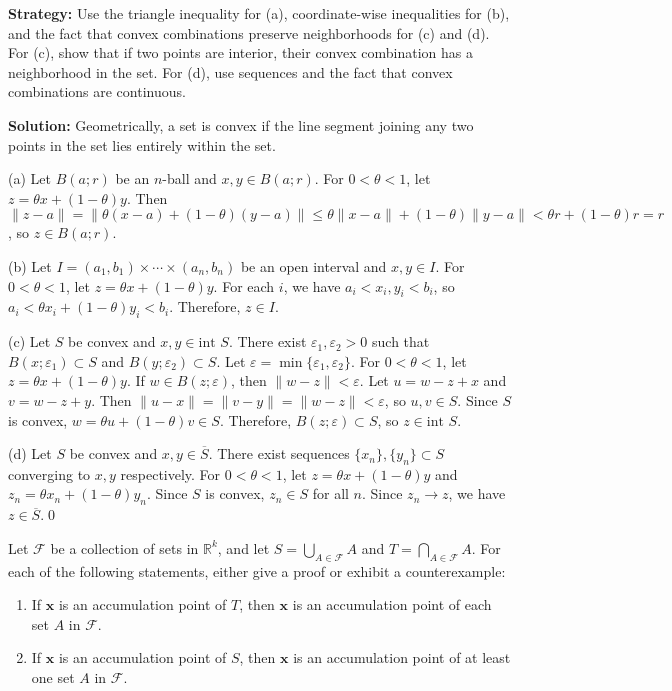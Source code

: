 \noindent\textbf{Strategy:} Use the triangle inequality for (a), coordinate-wise inequalities for (b), and the fact that convex combinations preserve neighborhoods for (c) and (d). For (c), show that if two points are interior, their convex combination has a neighborhood in the set. For (d), use sequences and the fact that convex combinations are continuous.

\bigskip\noindent\textbf{Solution:} Geometrically, a set is convex if the line segment joining any two points in the set lies entirely within the set.

(a) Let $B(a;r)$ be an $n$-ball and $x, y \in B(a;r)$. For $0 < \theta < 1$, let $z = \theta x + (1-\theta)y$. Then $\|z-a\| = \|\theta(x-a) + (1-\theta)(y-a)\| \leq \theta\|x-a\| + (1-\theta)\|y-a\| < \theta r + (1-\theta)r = r$, so $z \in B(a;r)$.

(b) Let $I = (a_1,b_1) \times \cdots \times (a_n,b_n)$ be an open interval and $x, y \in I$. For $0 < \theta < 1$, let $z = \theta x + (1-\theta)y$. For each $i$, we have $a_i < x_i, y_i < b_i$, so $a_i < \theta x_i + (1-\theta)y_i < b_i$. Therefore, $z \in I$.

(c) Let $S$ be convex and $x, y \in \text{int } S$. There exist $\varepsilon_1, \varepsilon_2 > 0$ such that $B(x;\varepsilon_1) \subset S$ and $B(y;\varepsilon_2) \subset S$. Let $\varepsilon = \min\{\varepsilon_1, \varepsilon_2\}$. For $0 < \theta < 1$, let $z = \theta x + (1-\theta)y$. If $w \in B(z;\varepsilon)$, then $\|w-z\| < \varepsilon$. Let $u = w - z + x$ and $v = w - z + y$. Then $\|u-x\| = \|v-y\| = \|w-z\| < \varepsilon$, so $u, v \in S$. Since $S$ is convex, $w = \theta u + (1-\theta)v \in S$. Therefore, $B(z;\varepsilon) \subset S$, so $z \in \text{int } S$.

(d) Let $S$ be convex and $x, y \in \overline{S}$. There exist sequences $\{x_n\}, \{y_n\} \subset S$ converging to $x, y$ respectively. For $0 < \theta < 1$, let $z = \theta x + (1-\theta)y$ and $z_n = \theta x_n + (1-\theta)y_n$. Since $S$ is convex, $z_n \in S$ for all $n$. Since $z_n \to z$, we have $z \in \overline{S}$.\qed


\begin{problembox}            
Let $\mathcal{F}$ be a collection of sets in $\mathbb{R}^k$, and let $S = \bigcup_{A \in \mathcal{F}} A$ and $T = \bigcap_{A \in \mathcal{F}} A$. For each of the following statements, either give a proof or exhibit a counterexample:
\begin{enumerate}[label=\alph*)]
\item If $\mathbf{x}$ is an accumulation point of $T$, then $\mathbf{x}$ is an accumulation point of each set $A$ in $\mathcal{F}$.
\item If $\mathbf{x}$ is an accumulation point of $S$, then $\mathbf{x}$ is an accumulation point of at least one set $A$ in $\mathcal{F}$.
\end{enumerate}
\end{problembox}

